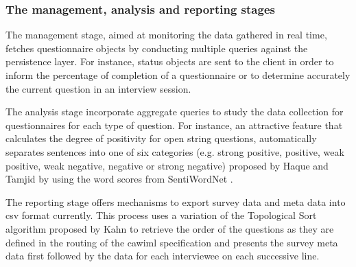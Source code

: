 	\subsubsection{The management, analysis and reporting stages}

	The management stage, aimed at monitoring the data gathered in real time, fetches questionnaire objects by conducting multiple queries against the persistence layer. For instance, status objects are sent to the client in order to inform the percentage of completion of a questionnaire or to determine accurately the current question in an interview session.

	The analysis stage incorporate aggregate queries to study the data collection for questionnaires for each type of question. For instance, an attractive feature that calculates the degree of positivity for open string questions, automatically separates sentences into one of six categories (e.g. strong positive, positive, weak positive, weak negative, negative or strong negative) proposed by Haque and Tamjid \cite{art:haque14} by using the word scores from SentiWordNet \cite{proc:esuli06}. %

	The reporting stage offers mechanisms to export survey data and meta data into \gls{csv} format currently. This process uses a variation of the Topological Sort algorithm proposed by Kahn \cite{art:kahn62} to retrieve the order of the questions as they are defined in the routing of the \gls{cawiml} specification and presents the survey meta data first followed by the data for each interviewee on each successive line.

	
